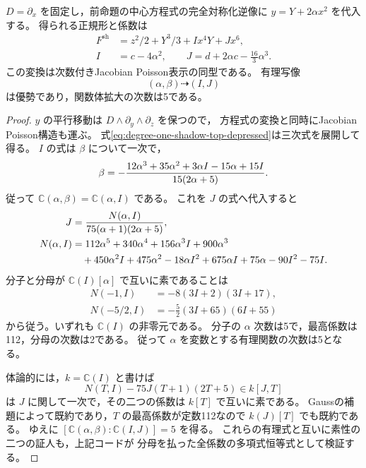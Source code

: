 \begin{proposition}[Poisson正規化後の関数体次数]
\label{prop:degree-one-shadow-top-degree-five}
$D=\partial_x$ を固定し，前命題の中心方程式の完全対称化逆像に
$y=Y+2\alpha x^2$ を代入する。
得られる正規形と係数は
\begin{align}
 F^{\mathrm{sh}}&=z^2/2+Y^3/3+I x^4Y+Jx^6,\\
 I&=c-4\alpha^2,\qquad
 J=d+2\alpha c-\frac{16}{3}\alpha^3.
       \label{eq:degree-one-shadow-top-depressed}
\end{align}
この変換は次数付きJacobian Poisson表示の同型である。
有理写像
\[
                (\alpha,\beta)\dashrightarrow(I,J)
\]
は優勢であり，関数体拡大の次数は5である。
\end{proposition}
\begin{proof}
$y$ の平行移動は $D\wedge\partial_y\wedge\partial_z$ を保つので，
方程式の変換と同時にJacobian Poisson構造も運ぶ。
式\eqref{eq:degree-one-shadow-top-depressed}は三次式を展開して得る。
$I$ の式は $\beta$ について一次で，
\begin{equation}
\label{eq:degree-one-shadow-top-beta-inverse}
 \beta=-{12\alpha^3+35\alpha^2+3\alpha I-15\alpha+15I
                    \over15(2\alpha+5)}.
\end{equation}
従って $\mathbb C(\alpha,\beta)=\mathbb C(\alpha,I)$ である。
これを $J$ の式へ代入すると
\begin{align}
 J&={N(\alpha,I)\over75(\alpha+1)(2\alpha+5)},
       \label{eq:degree-one-shadow-top-rational-map}\\
 N(\alpha,I)
  &={112\alpha^5+340\alpha^4+156\alpha^3I+900\alpha^3}
       \notag\\
  &\quad+450\alpha^2I+475\alpha^2-18\alpha I^2
         +675\alpha I+75\alpha-90I^2-75I.
       \label{eq:degree-one-shadow-top-numerator}
\end{align}
分子と分母が $\mathbb C(I)[\alpha]$ で互いに素であることは
\begin{align*}
 N(-1,I)&=-8(3I+2)(3I+17),\\
 N(-5/2,I)&=-\frac52(3I+65)(6I+55)
\end{align*}
から従う。いずれも $\mathbb C(I)$ の非零元である。
分子の $\alpha$ 次数は5で，最高係数は112，分母の次数は2である。
従って $\alpha$ を変数とする有理関数の次数は5となる。

体論的には，$k=\mathbb C(I)$ と書けば
\[
             N(T,I)-75J(T+1)(2T+5)\in k[J,T]
\]
は $J$ に関して一次で，その二つの係数は $k[T]$ で互いに素である。
Gaussの補題によって既約であり，$T$ の最高係数が定数112なので
$k(J)[T]$ でも既約である。
ゆえに $[\mathbb C(\alpha,\beta):\mathbb C(I,J)]=5$ を得る。
これらの有理式と互いに素性の二つの証人も，上記コードが
分母を払った全係数の多項式恒等式として検証する。
\end{proof}

